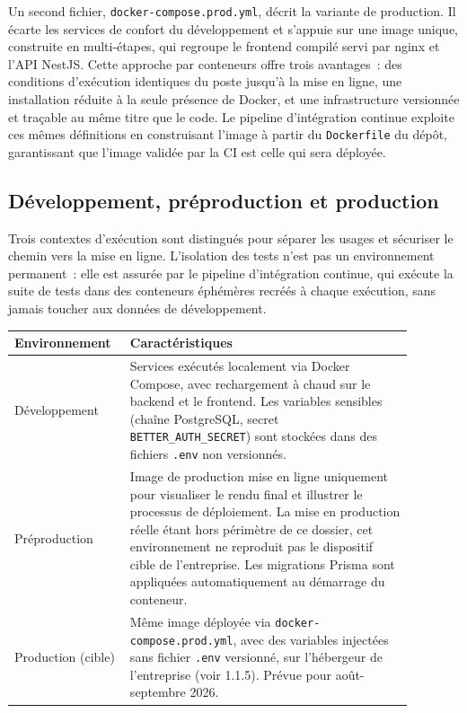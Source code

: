Un second fichier, \texttt{docker-compose.prod.yml}, décrit la variante de production. Il écarte les services de confort du développement et s'appuie sur une image unique, construite en multi-étapes, qui regroupe le frontend compilé servi par nginx et l'API NestJS. Cette approche par conteneurs offre trois avantages~: des conditions d'exécution identiques du poste jusqu'à la mise en ligne, une installation réduite à la seule présence de Docker, et une infrastructure versionnée et traçable au même titre que le code. Le pipeline d'intégration continue exploite ces mêmes définitions en construisant l'image à partir du \texttt{Dockerfile} du dépôt, garantissant que l'image validée par la CI est celle qui sera déployée.

\clearpage
\subsection{Développement, préproduction et production}
Trois contextes d'exécution sont distingués pour séparer les usages et sécuriser le chemin vers la mise en ligne. L'isolation des tests n'est pas un environnement permanent~: elle est assurée par le pipeline d'intégration continue, qui exécute la suite de tests dans des conteneurs éphémères recréés à chaque exécution, sans jamais toucher aux données de développement.

\begin{table}[H]
    \centering
    \begin{tabular}{|>{\raggedright\arraybackslash}p{0.22\linewidth}|>{\raggedright\arraybackslash}p{0.66\linewidth}|}
        \hline
        \textbf{Environnement} & \textbf{Caractéristiques} \\
        \hline
        Développement & Services exécutés localement via Docker Compose, avec rechargement à chaud sur le backend et le frontend. Les variables sensibles (chaîne PostgreSQL, secret \texttt{BETTER\_AUTH\_SECRET}) sont stockées dans des fichiers \texttt{.env} non versionnés. \\
        \hline
        Préproduction & Image de production mise en ligne uniquement pour visualiser le rendu final et illustrer le processus de déploiement. La mise en production réelle étant hors périmètre de ce dossier, cet environnement ne reproduit pas le dispositif cible de l'entreprise. Les migrations Prisma sont appliquées automatiquement au démarrage du conteneur. \\
        \hline
        Production (cible) & Même image déployée via \texttt{docker-compose.prod.yml}, avec des variables injectées sans fichier \texttt{.env} versionné, sur l'hébergeur de l'entreprise (voir 1.1.5). Prévue pour août-septembre 2026. \\
        \hline
    \end{tabular}
\end{table}


